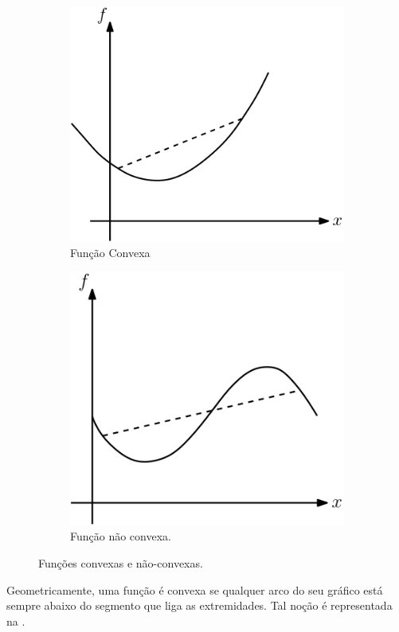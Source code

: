 \documentclass[12pt,a4paper]{scrartcl}
\theoremstyle{definition}%
\begin{document}
\begin{figure}[!ht] 
\centering
\begin{subfigure}[h]{0.42\textwidth}
\centering
\includegraphics[width=\textwidth]{funcao_convexa_1}
\caption{Função Convexa \label{fig:funcao_convexa}}
\end{subfigure}
\begin{subfigure}[!ht]{0.40\textwidth}
	\centering
	\includegraphics[width=\textwidth]{funcao_nao_convexa}
	\caption{Função não convexa. \label{fig:funcao_nao_convexa}}
\end{subfigure}
\caption{Funções convexas e não-convexas. \label{fig:exemplos_funcao_convexa}}
\end{figure}
Geometricamente, uma função é convexa se qualquer arco do seu gráfico está sempre abaixo do segmento que liga as extremidades. Tal noção é representada na . 
\end{document}

